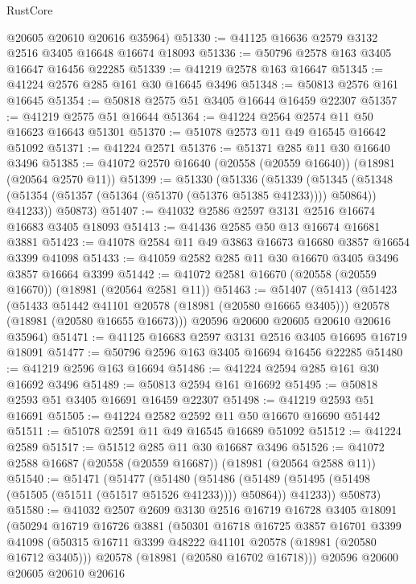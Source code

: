 \begin{lexlean}{RustCore}
\begin{coremodule}
      @20605
      @20610
      @20616
      @35964)
@51330 := @41125 @16636 @2579 @3132 @2516 @3405 @16648 @16674 @18093
@51336 := @50796 @2578 @163 @3405 @16647 @16456 @22285
@51339 := @41219 @2578 @163 @16647
@51345 := @41224 @2576 @285 @161 @30 @16645 @3496
@51348 := @50813 @2576 @161 @16645
@51354 := @50818 @2575 @51 @3405 @16644 @16459 @22307
@51357 := @41219 @2575 @51 @16644
@51364 := @41224 @2564 @2574 @11 @50 @16623 @16643 @51301
@51370 := @51078 @2573 @11 @49 @16545 @16642 @51092
@51371 := @41224 @2571
@51376 := @51371 @285 @11 @30 @16640 @3496
@51385 := @41072 @2570 @16640 (@20558 (@20559 @16640)) (@18981 (@20564 @2570 @11))
@51399 := @51330
    (@51336
      (@51339
        (@51345 (@51348 (@51354 (@51357 (@51364 (@51370 (@51376 @51385 @41233)))) @50864)) @41233))
      @50873)
@51407 := @41032 @2586 @2597 @3131 @2516 @16674 @16683 @3405 @18093
@51413 := @41436 @2585 @50 @13 @16674 @16681 @3881
@51423 := @41078 @2584 @11 @49 @3863 @16673 @16680 @3857 @16654 @3399 @41098
@51433 := @41059 @2582 @285 @11 @30 @16670 @3405 @3496 @3857 @16664 @3399
@51442 := @41072 @2581 @16670 (@20558 (@20559 @16670)) (@18981 (@20564 @2581 @11))
@51463 := @51407
    (@51413
      (@51423
        (@51433 @51442 @41101 @20578 (@18981 (@20580 @16665 @3405)))
        @20578
        (@18981 (@20580 @16655 @16673)))
      @20596
      @20600
      @20605
      @20610
      @20616
      @35964)
@51471 := @41125 @16683 @2597 @3131 @2516 @3405 @16695 @16719 @18091
@51477 := @50796 @2596 @163 @3405 @16694 @16456 @22285
@51480 := @41219 @2596 @163 @16694
@51486 := @41224 @2594 @285 @161 @30 @16692 @3496
@51489 := @50813 @2594 @161 @16692
@51495 := @50818 @2593 @51 @3405 @16691 @16459 @22307
@51498 := @41219 @2593 @51 @16691
@51505 := @41224 @2582 @2592 @11 @50 @16670 @16690 @51442
@51511 := @51078 @2591 @11 @49 @16545 @16689 @51092
@51512 := @41224 @2589
@51517 := @51512 @285 @11 @30 @16687 @3496
@51526 := @41072 @2588 @16687 (@20558 (@20559 @16687)) (@18981 (@20564 @2588 @11))
@51540 := @51471
    (@51477
      (@51480
        (@51486 (@51489 (@51495 (@51498 (@51505 (@51511 (@51517 @51526 @41233)))) @50864)) @41233))
      @50873)
@51580 := @41032
    @2507
    @2609
    @3130
    @2516
    @16719
    @16728
    @3405
    @18091
    (@50294
      @16719
      @16726
      @3881
      (@50301
        @16718
        @16725
        @3857
        @16701
        @3399
        @41098
        (@50315 @16711 @3399 @48222 @41101 @20578 (@18981 (@20580 @16712 @3405)))
        @20578
        (@18981 (@20580 @16702 @16718)))
      @20596
      @20600
      @20605
      @20610
      @20616

\end{coremodule}
\end{lexlean}
